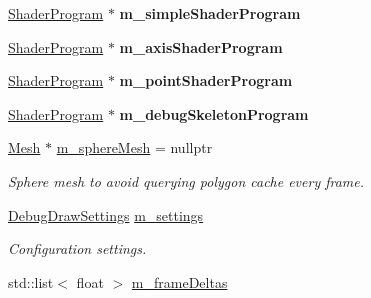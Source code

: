 \begin{Indent}
\begin{DoxyCompactItemize}
\mbox{\label{classrev_1_1_debug_manager_a211ad3ace217044a89928864be6ce9e5}} 
\mbox{\hyperlink{classrev_1_1_shader_program}{Shader\+Program}} $\ast$ {\bfseries m\+\_\+simple\+Shader\+Program}
\item 
\mbox{\label{classrev_1_1_debug_manager_a1dd2954ee3079bc85bc01c30618c1215}} 
\mbox{\hyperlink{classrev_1_1_shader_program}{Shader\+Program}} $\ast$ {\bfseries m\+\_\+axis\+Shader\+Program}
\item 
\mbox{\label{classrev_1_1_debug_manager_a61011974f74c72d65c3c2e2b4b4cf211}} 
\mbox{\hyperlink{classrev_1_1_shader_program}{Shader\+Program}} $\ast$ {\bfseries m\+\_\+point\+Shader\+Program}
\item 
\mbox{\label{classrev_1_1_debug_manager_aec59c1ba0550d054ba3cf33b0d358b00}} 
\mbox{\hyperlink{classrev_1_1_shader_program}{Shader\+Program}} $\ast$ {\bfseries m\+\_\+debug\+Skeleton\+Program}
\item 
\mbox{\label{classrev_1_1_debug_manager_a1ffa9e17d3fed23942d120682b1a8a91}} 
\mbox{\hyperlink{classrev_1_1_mesh}{Mesh}} $\ast$ \mbox{\hyperlink{classrev_1_1_debug_manager_a1ffa9e17d3fed23942d120682b1a8a91}{m\+\_\+sphere\+Mesh}} = nullptr
\begin{DoxyCompactList}\small\item\em Sphere mesh to avoid querying polygon cache every frame. \end{DoxyCompactList}\item 
\mbox{\label{classrev_1_1_debug_manager_abc597939c6e05f946bf35e1dd9a20d36}} 
\mbox{\hyperlink{classrev_1_1_debug_draw_settings}{Debug\+Draw\+Settings}} \mbox{\hyperlink{classrev_1_1_debug_manager_abc597939c6e05f946bf35e1dd9a20d36}{m\+\_\+settings}}
\begin{DoxyCompactList}\small\item\em Configuration settings. \end{DoxyCompactList}\item 
\mbox{\label{classrev_1_1_debug_manager_a74ba20b8daee41371c5b16f66d635412}} 
std\+::list$<$ float $>$ \mbox{\hyperlink{classrev_1_1_debug_manager_a74ba20b8daee41371c5b16f66d635412}{m\+\_\+frame\+Deltas}}

\end{DoxyCompactItemize}
\end{Indent}
